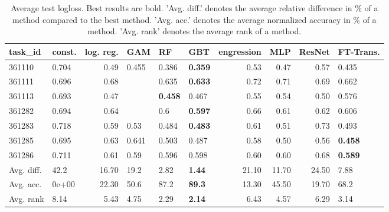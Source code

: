 \begin{table}[ht!]
\centering
\begingroup\footnotesize
\begin{tabular}{llrlllrrrl}
  \hline
\hline
task\_id & const. & log. reg. & GAM & RF & GBT & engression & MLP & ResNet & FT-Trans. \\ 
  \hline
361110 & 0.704 & 0.49 & 0.455 & 0.386 & \textbf{0.359} & 0.53 & 0.47 & 0.57 & 0.435 \\ 
  361111 & 0.696 & 0.68 &  & 0.635 & \textbf{0.633} & 0.72 & 0.71 & 0.69 & 0.662 \\ 
  361113 & 0.693 & 0.47 &  & \textbf{0.458} & 0.467 & 0.55 & 0.54 & 0.50 & 0.576 \\ 
  361282 & 0.694 & 0.64 &  & 0.6 & \textbf{0.597} & 0.66 & 0.61 & 0.62 & 0.606 \\ 
  361283 & 0.718 & 0.59 & 0.53 & 0.484 & \textbf{0.483} & 0.61 & 0.51 & 0.73 & 0.493 \\ 
  361285 & 0.695 & 0.63 & 0.641 & 0.503 & 0.487 & 0.58 & 0.50 & 0.56 & \textbf{0.458} \\ 
  361286 & 0.711 & 0.61 & 0.59 & 0.596 & 0.598 & 0.60 & 0.60 & 0.68 & \textbf{0.589} \\ 
   \hline
Avg. diff. & 42.2 & 16.70 & 19.2 & 2.82 & \textbf{1.44} & 21.10 & 11.70 & 24.50 & 7.88 \\ 
  Avg. acc. & 0e+00 & 22.30 & 50.6 & 87.2 & \textbf{89.3} & 13.30 & 45.50 & 19.70 & 68.2 \\ 
  Avg. rank & 8.14 & 5.43 & 4.75 & 2.29 & \textbf{2.14} & 6.43 & 4.57 & 6.29 & 3.14 \\ 
   \hline
\hline
\end{tabular}
\endgroup
\caption{Average test logloss. 
                  Best results are bold. 
                  'Avg. diff.' denotes the average relative difference in \% of a method compared to the best method.
                  'Avg. acc.' denotes the average normalized accuracy in \% of a method.
                  'Avg. rank' denotes the average rank of a method.} 
\label{TABLES/table_results_logloss_gower_num_and_cat_features}
\end{table}
